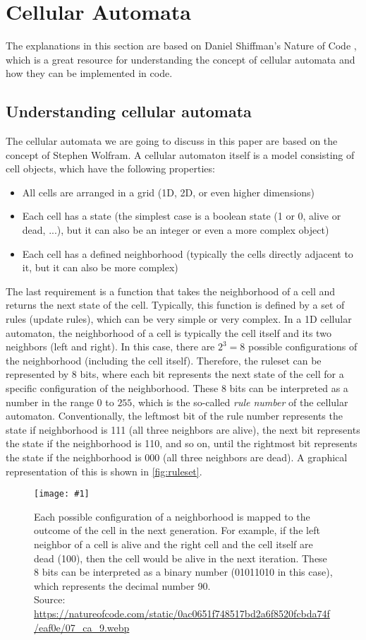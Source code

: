 \documentclass[a4paper,12pt]{llncs}
\numberwithin{equation}{section}
\newcommand{\imagewithwidth}[5]{
  \begin{figure}[htbp]%
    \begin{center}%
      \texttt{[image: \#1]}%
      \caption[#5]{#4}%
      \label{#3}%
    \end{center}%
  \end{figure}
}
\begin{document}
\section{Cellular Automata}
The explanations in this section are based on Daniel Shiffman's Nature of Code \cite{NOC}, which is a great resource for understanding the concept of cellular automata and how they can be implemented in code.
\subsection{Understanding cellular automata}
\label{sec:cellular-automata-understanding}
The cellular automata we are going to discuss in this paper are based on the concept of Stephen Wolfram.
A cellular automaton itself is a model consisting of cell objects, which have the following properties:
\begin{itemize}
  \item All cells are arranged in a grid (1D, 2D, or even higher dimensions)
  \item Each cell has a state (the simplest case is a boolean state (1 or 0, alive or dead, ...), but it can also be an integer or even a more complex object)
  \item Each cell has a defined neighborhood (typically the cells directly adjacent to it, but it can also be more complex)
\end{itemize}
The last requirement is a function that takes the neighborhood of a cell and returns the next state of the cell.
Typically, this function is defined by a set of rules (update rules), which can be very simple or very complex.
In a 1D cellular automaton, the neighborhood of a cell is typically the cell itself and its two neighbors (left and right).
In this case, there are $2^3=8$ possible configurations of the neighborhood (including the cell itself).
Therefore, the ruleset can be represented by 8 bits, where each bit represents the next state of the cell for a specific configuration of the neighborhood.
These 8 bits can be interpreted as a number in the range $0$ to $255$, which is the so-called \textit{rule number} of the cellular automaton.
Conventionally, the leftmost bit of the rule number represents the state if neighborhood is 111 (all three neighbors are alive), the next bit represents the state if the neighborhood is 110, and so on, until the rightmost bit represents the state if the neighborhood is 000 (all three neighbors are dead).
A graphical representation of this is shown in \autoref{fig:ruleset}.
\imagewithwidth{figures/ruleset_example}{0.7\textwidth}{fig:ruleset}{Each possible configuration of a neighborhood is mapped to the outcome of the cell in the next generation. For example, if the left neighbor of a cell is alive and the right cell and the cell itself are dead (100), then the cell would be alive in the next iteration. These 8 bits can be interpreted as a binary number (01011010 in this case), which represents the decimal number 90.\\Source: \url{https://natureofcode.com/static/0ac0651f748517bd2a6f8520fcbda74f/eaf0e/07_ca_9.webp}}{}
\end{document}
